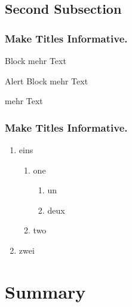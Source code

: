 \documentclass{beamer}
\begin{document}
\subsection{Second Subsection}

\begin{frame}
  \frametitle{Make Titles Informative.}

  \begin{block}{Block}
    mehr Text
  \end{block}

  \begin{alertblock}{Alert Block}
    mehr Text
  \end{alertblock}

  \begin{example}
    mehr Text
  \end{example}
\end{frame}

\begin{frame}
  \frametitle{Make Titles Informative.}

  \begin{enumerate}
    \item eins
      \begin{enumerate}
        \item one
          \begin{enumerate}
            \item un
            \item deux
          \end{enumerate}
        \item two
      \end{enumerate}
    \item zwei
  \end{enumerate}
\end{frame}



\section{Summary}
\end{document}
